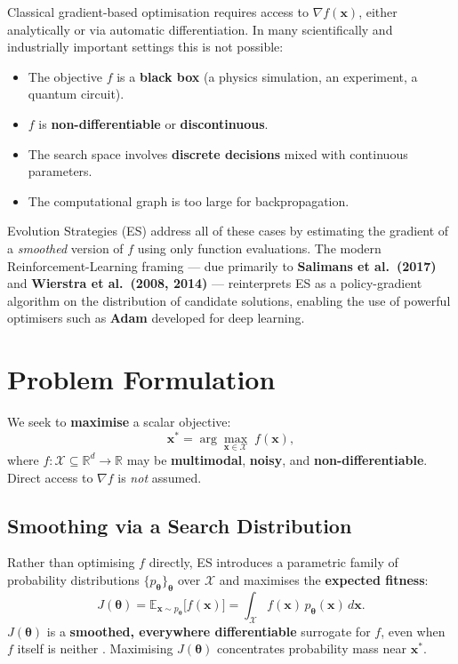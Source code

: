 \documentclass[12pt, a4paper]{article}
\newcommand{\btheta}{\boldsymbol{\theta}}
\newcommand{\bx}{\mathbf{x}}
\newcommand{\EE}{\mathbb{E}}
\newcommand{\RR}{\mathbb{R}}
\newcommand{\cX}{\mathcal{X}}
\begin{document}
Classical gradient-based optimisation requires access to $\nabla f(\bx)$,
either analytically or via automatic differentiation.
In many scientifically and industrially important settings this is not possible:

\begin{itemize}
  \item The objective $f$ is a \textbf{black box}
        (a physics simulation, an experiment, a quantum circuit).
  \item $f$ is \textbf{non-differentiable} or \textbf{discontinuous}.
  \item The search space involves \textbf{discrete decisions} mixed with
        continuous parameters.
  \item The computational graph is too large for backpropagation.
\end{itemize}

Evolution Strategies (ES) address all of these cases by estimating the
gradient of a \emph{smoothed} version of $f$ using only function evaluations.
The modern Reinforcement-Learning framing --- due primarily to
\textbf{Salimans et al.\ (2017)} \cite{salimans2017} and
\textbf{Wierstra et al.\ (2008, 2014)} \cite{wierstra2008, wierstra2014} ---
reinterprets ES as a policy-gradient algorithm on the distribution of
candidate solutions, enabling the use of powerful optimisers such as
\textbf{Adam} \cite{kingma2015} developed for deep learning.

\section{Problem Formulation}
\label{sec:problem}

We seek to \textbf{maximise} a scalar objective:
\begin{equation}
  \bx^{*} = \arg\max_{\bx \in \cX}\; f(\bx),
\end{equation}
where $f : \cX \subseteq \RR^d \to \RR$ may be \textbf{multimodal},
\textbf{noisy}, and \textbf{non-differentiable}.
Direct access to $\nabla f$ is \emph{not} assumed.

\subsection{Smoothing via a Search Distribution}

Rather than optimising $f$ directly, ES introduces a parametric family of
probability distributions $\{p_{\btheta}\}_{\btheta}$ over $\cX$ and
maximises the \textbf{expected fitness}:
\begin{equation}
  J(\btheta)
  = \EE_{\bx \sim p_{\btheta}}\!\bigl[f(\bx)\bigr]
  = \int_{\cX} f(\bx)\, p_{\btheta}(\bx)\, d\bx.
  \label{eq:expected_fitness}
\end{equation}
$J(\btheta)$ is a \textbf{smoothed, everywhere differentiable}
surrogate for $f$, even when $f$ itself is neither \cite{nesterov2017}.
Maximising $J(\btheta)$ concentrates probability mass near $\bx^*$.
\end{document}
